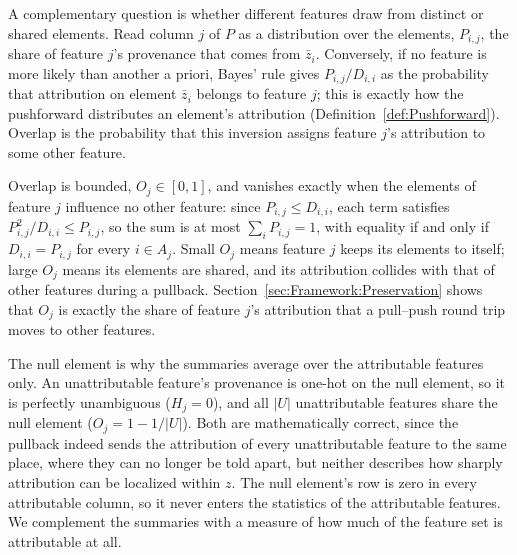 A complementary question is whether different features draw from distinct or shared elements. Read column $j$ of $P$ as a distribution over the elements, $P_{i,j}$, the share of feature $j$'s provenance that comes from $\bar{z}_i$. Conversely, if no feature is more likely than another a priori, Bayes' rule gives $P_{i,j} / D_{i,i}$ as the probability that attribution on element $\bar{z}_i$ belongs to feature $j$; this is exactly how the pushforward distributes an element's attribution (Definition~\ref{def:Pushforward}). Overlap is the probability that this inversion assigns feature $j$'s attribution to some other feature.


Overlap is bounded, $O_j \in [0, 1]$, and vanishes exactly when the elements of feature $j$ influence no other feature: since $P_{i,j} \le D_{i,i}$, each term satisfies $P_{i,j}^2 / D_{i,i} \le P_{i,j}$, so the sum is at most $\sum_i P_{i,j} = 1$, with equality if and only if $D_{i,i} = P_{i,j}$ for every $i \in A_j$. Small $O_j$ means feature $j$ keeps its elements to itself; large $O_j$ means its elements are shared, and its attribution collides with that of other features during a pullback. Section~\ref{sec:Framework:Preservation} shows that $O_j$ is exactly the share of feature $j$'s attribution that a pull--push round trip moves to other features.

The null element is why the summaries average over the attributable features only. An unattributable feature's provenance is one-hot on the null element, so it is perfectly unambiguous ($H_j = 0$), and all $|U|$ unattributable features share the null element ($O_j = 1 - 1/|U|$). Both are mathematically correct, since the pullback indeed sends the attribution of every unattributable feature to the same place, where they can no longer be told apart, but neither describes how sharply attribution can be localized within $z$. The null element's row is zero in every attributable column, so it never enters the statistics of the attributable features. We complement the summaries with a measure of how much of the feature set is attributable at all.


